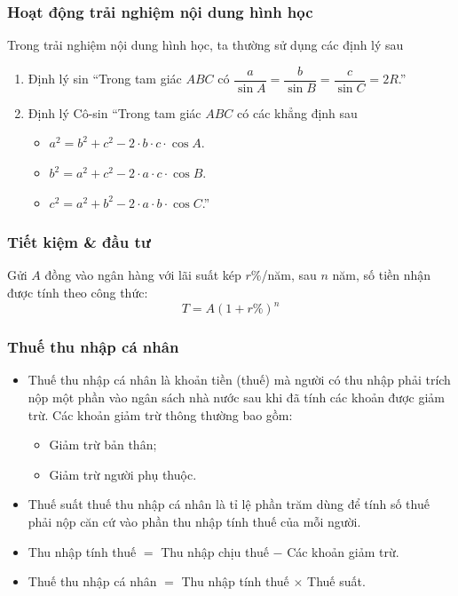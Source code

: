 \subsubsection{Hoạt động trải nghiệm nội dung hình học}
Trong trải nghiệm nội dung hình học, ta thường sử dụng các định lý sau
\begin{enumerate}
\item Định lý sin ``Trong tam giác $ABC$ có $\dfrac{a}{\sin A}=\dfrac{b}{\sin B}=\dfrac{c}{\sin C}=2R$.''
\item Định lý Cô-sin ``Trong tam giác $ABC$ có các khẳng định sau
\begin{itemize}
\item $a^{2}=b^{2}+c^{2}-2 \cdot b \cdot c \cdot \cos A$.
\item $b^{2}=a^{2}+c^{2}-2 \cdot a \cdot c \cdot \cos B$.
\item $c^{2}=a^{2}+b^{2}-2 \cdot a \cdot b \cdot \cos C$.''
\end{itemize}
\end{enumerate}

\subsubsection{Tiết kiệm \& đầu tư}
		Gửi $A$ đồng vào ngân hàng với lãi suất kép $r\%$/năm, sau $n$ năm, số tiền nhận được tính theo công thức:
		$$T = A (1+r\%)^n$$
\subsubsection{Thuế thu nhập cá nhân}
		\begin{itemize}
		\item Thuế thu nhập cá nhân là khoản tiền (thuế) mà người có thu nhập phải trích nộp một phần vào ngân sách nhà nước sau khi đã tính các khoản được giảm trừ. Các khoản giảm trừ thông thường bao gồm:
		\begin{itemize}
		\item Giảm trừ bản thân;
		\item Giảm trừ người phụ thuộc.
		\end{itemize}
		\item Thuế suất thuế thu nhập cá nhân là tỉ lệ phần trăm dùng để tính số thuế phải nộp căn cứ vào phần thu nhập tính thuế của mỗi người.
		\item Thu nhập tính thuế $=$ Thu nhập chịu thuế $-$ Các khoản giảm trừ.
		\item Thuế thu nhập cá nhân $=$ Thu nhập tính thuế $\times$ Thuế suất.
		\end{itemize}
	
